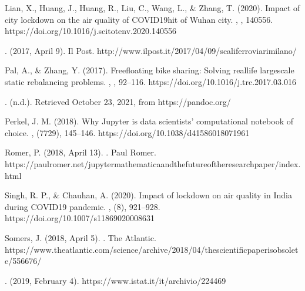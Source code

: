\documentclass[letterpaper,10pt,english]{jupyterBook}
\begin{document}
\sphinxAtStartPar
Lian, X., Huang, J., Huang, R., Liu, C., Wang, L., \& Zhang, T. (2020). Impact of city lockdown on the air quality of COVID\sphinxhyphen{}19\sphinxhyphen{}hit of Wuhan city. , , 140556. https://doi.org/10.1016/j.scitotenv.2020.140556

\sphinxAtStartPar
{}. (2017, April 9). Il Post. http://www.ilpost.it/2017/04/09/scali\sphinxhyphen{}ferroviari\sphinxhyphen{}milano/

\sphinxAtStartPar
Pal, A., \& Zhang, Y. (2017). Free\sphinxhyphen{}floating bike sharing: Solving real\sphinxhyphen{}life large\sphinxhyphen{}scale static rebalancing problems. , , 92–116. https://doi.org/10.1016/j.trc.2017.03.016

\sphinxAtStartPar
{}. (n.d.). Retrieved October 23, 2021, from https://pandoc.org/

\sphinxAtStartPar
Perkel, J. M. (2018). Why Jupyter is data scientists’ computational notebook of choice. , (7729), 145–146. https://doi.org/10.1038/d41586\sphinxhyphen{}018\sphinxhyphen{}07196\sphinxhyphen{}1

\sphinxAtStartPar
Romer, P. (2018, April 13). . Paul Romer. https://paulromer.net/jupyter\sphinxhyphen{}mathematica\sphinxhyphen{}and\sphinxhyphen{}the\sphinxhyphen{}future\sphinxhyphen{}of\sphinxhyphen{}the\sphinxhyphen{}research\sphinxhyphen{}paper/index.html

\sphinxAtStartPar
Singh, R. P., \& Chauhan, A. (2020). Impact of lockdown on air quality in India during COVID\sphinxhyphen{}19 pandemic. , (8), 921–928. https://doi.org/10.1007/s11869\sphinxhyphen{}020\sphinxhyphen{}00863\sphinxhyphen{}1

\sphinxAtStartPar
Somers, J. (2018, April 5). . The Atlantic. https://www.theatlantic.com/science/archive/2018/04/the\sphinxhyphen{}scientific\sphinxhyphen{}paper\sphinxhyphen{}is\sphinxhyphen{}obsolete/556676/

\sphinxAtStartPar
{}. (2019, February 4). https://www.istat.it/it/archivio/224469
\end{document}
